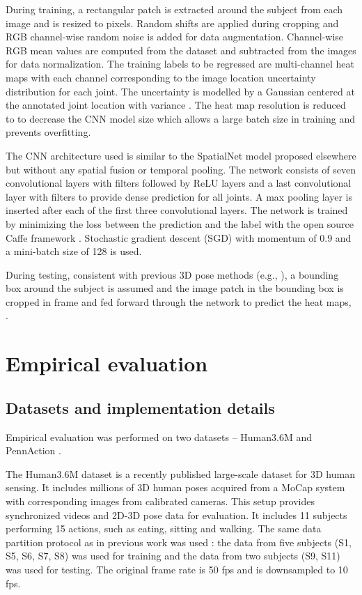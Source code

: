 \documentclass[10pt,twocolumn,letterpaper]{article}
\begin{document}
{During training, a rectangular patch is extracted around the subject from each image and is resized to   pixels. Random shifts are applied during cropping and RGB channel-wise random noise is added for data augmentation. Channel-wise RGB mean values are computed from the dataset and subtracted from the images for data normalization. The training labels to be regressed are multi-channel heat maps with each channel corresponding to the image location uncertainty distribution for each joint. The uncertainty is modelled by a Gaussian centered at the annotated joint location with variance . The heat map resolution is reduced to  to decrease the CNN model size which allows a large batch size in training and prevents overfitting.

The CNN architecture used is similar to the SpatialNet model proposed elsewhere \cite{pfister2015flowing} but without any spatial fusion or temporal pooling. The network consists of seven convolutional layers with  filters followed by ReLU layers and a last convolutional layer with  filters to provide dense prediction for all joints. A  max pooling layer is inserted after each of the first three convolutional layers. The network is trained by minimizing the  loss between the prediction and the label with the open source Caffe framework \cite{jia2014caffe}. Stochastic gradient descent (SGD) with momentum of 0.9 and a mini-batch size of 128 is used. 

During testing, consistent with previous 3D pose methods (e.g., \cite{li2015maximum,tekin2015predicting}), a bounding box around the subject is assumed and the image patch in the bounding box  is cropped in frame  and fed forward through the network to predict the heat maps, .





 
\section{Empirical evaluation}
\subsection{Datasets and implementation details}

Empirical evaluation was performed on two datasets -- Human3.6M \cite{ionescu2014human} and PennAction \cite{zhang2013actemes}.

The Human3.6M dataset \cite{ionescu2014human} is a recently published large-scale dataset for 3D human sensing. It includes millions of 3D human poses acquired from a MoCap system with corresponding images from calibrated cameras.
This setup provides synchronized videos and 2D-3D pose data for evaluation. It includes 11 subjects performing 15 actions, 
such as eating, sitting and walking. The same data partition protocol as in previous work was used \cite{li2015maximum,tekin2015predicting}: the data from five subjects (S1, S5, S6, S7, S8) was used for training and the data from two subjects (S9, S11) was used for testing. The original frame rate is 50 fps and is downsampled to 10 fps.

}
\end{document}
